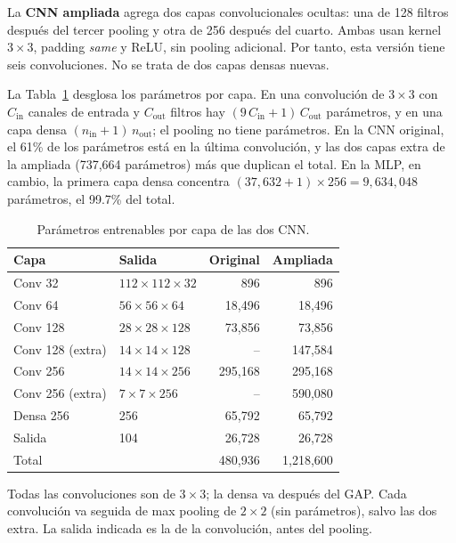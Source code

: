 La \textbf{CNN ampliada} agrega dos capas convolucionales ocultas: una de 128
filtros después del tercer pooling y otra de 256 después del cuarto. Ambas usan
kernel $3\times3$, padding \textit{same} y ReLU, sin pooling adicional. Por tanto,
esta versión tiene seis convoluciones. No se trata de dos capas densas nuevas.

La Tabla~\ref{tab:parametros} desglosa los parámetros por capa. En una
convolución de $3\times3$ con $C_{\text{in}}$ canales de entrada y
$C_{\text{out}}$ filtros hay $(9\,C_{\text{in}}+1)\,C_{\text{out}}$ parámetros, y
en una capa densa $(n_{\text{in}}+1)\,n_{\text{out}}$; el pooling no tiene
parámetros. En la CNN original, el 61\% de los parámetros está en la última
convolución, y las dos capas extra de la ampliada (737,664 parámetros) más que
duplican el total. En la MLP, en cambio, la primera capa densa concentra
$(37{,}632+1)\times256 = 9{,}634{,}048$ parámetros, el 99.7\% del total.

\begin{table}[htbp]
\centering
\caption{Parámetros entrenables por capa de las dos CNN.}
\label{tab:parametros}
\small
\setlength{\tabcolsep}{4pt}
\begin{tabular}{llrr}
\toprule
Capa & Salida & Original & Ampliada \\
\midrule
Conv 32 & $112\times112\times32$ & 896 & 896 \\
Conv 64 & $56\times56\times64$ & 18,496 & 18,496 \\
Conv 128 & $28\times28\times128$ & 73,856 & 73,856 \\
Conv 128 (extra) & $14\times14\times128$ & -- & 147,584 \\
Conv 256 & $14\times14\times256$ & 295,168 & 295,168 \\
Conv 256 (extra) & $7\times7\times256$ & -- & 590,080 \\
Densa 256 & 256 & 65,792 & 65,792 \\
Salida & 104 & 26,728 & 26,728 \\
\midrule
Total & & 480,936 & 1,218,600 \\
\bottomrule
\end{tabular}
\par\smallskip
\parbox{0.95\columnwidth}{\footnotesize Todas las convoluciones son de $3\times3$; la densa va después del GAP. Cada convolución va seguida de max pooling de $2\times2$ (sin parámetros), salvo las dos extra. La salida indicada es la de la convolución, antes del pooling.}
\end{table}

